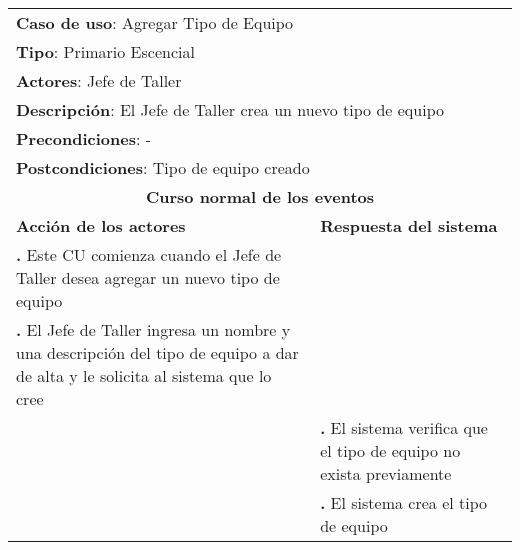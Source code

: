 \documentclass[12pt]{extarticle}
\begin{document}
    \newcommand\inc{\stepcounter{step}\textbf{\thestep. }}
    \newcommand\resetinc{\setcounter{step}{0}}
    \newcommand\raya{\noindent\rule{169mm}{0.8mm}\\}


	\begin{longtable}{ |p{8cm}|p{8cm}| }
		\hline
		\multicolumn{2}{|p{16cm}|}{\textbf{Caso de uso}: Agregar Tipo de Equipo}\\
		\multicolumn{2}{|p{16cm}|}{\textbf{Tipo}: Primario Escencial}\\
		\multicolumn{2}{|p{16cm}|}{\textbf{Actores}: Jefe de Taller}\\
		\multicolumn{2}{|p{16cm}|}{\textbf{Descripción}: El Jefe de Taller crea un nuevo tipo de equipo}\\
		\multicolumn{2}{|p{16cm}|}{\textbf{Precondiciones}: -}\\
		\multicolumn{2}{|p{16cm}|}{\textbf{Postcondiciones}: Tipo de equipo creado}\\
		\hline
		\multicolumn{2}{|c|}{\textbf{Curso normal de los eventos}}\\
		\hline
		\textbf{Acción de los actores} & \textbf{Respuesta del sistema}\\
		\hline
			\inc Este CU comienza cuando el Jefe de Taller desea agregar un nuevo tipo de equipo & \\
			\hline
            \inc  El Jefe de Taller ingresa un nombre y una descripción del tipo de equipo a dar de alta y le solicita al sistema que lo cree & \\
			\hline
            & \inc El sistema verifica que el tipo de equipo no exista previamente \\
			\hline
			& \inc El sistema crea el tipo de equipo \\
			\hline
            


\end{longtable}
\end{document}
